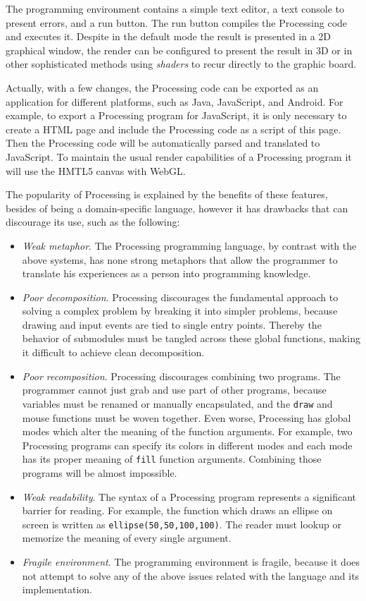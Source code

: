 The programming environment contains a simple text editor, a text console to present errors, and a run button. The run button compiles the Processing code and executes it. Despite in the default mode the result is presented in a 2D graphical window, the render can be configured to present the result in 3D or in other sophisticated methods using \textit{shaders} to recur directly to the graphic board.

Actually, with a few changes, the Processing code can be exported as an application for different platforms, such as Java, JavaScript, and Android. For example, to export a Processing program for JavaScript, it is only necessary to create a HTML page and include the Processing code as a script of this page. Then the Processing code will be automatically parsed and translated to JavaScript. To maintain the usual render capabilities of a Processing program it will use the HMTL5 canvas with WebGL.

The popularity of Processing is explained by the benefits of these features, besides of being a domain-specific language, however it has drawbacks that can discourage its use, such as the following:

\begin{itemize}
  \item \textit{Weak metaphor}. The Processing programming language, by contrast with the above systems, has none strong metaphors that allow the programmer to translate his experiences as a person into programming knowledge. 

  \item \textit{Poor decomposition}. Processing discourages the fundamental approach to solving a complex problem by breaking it into simpler problems, because drawing and input events are tied to single entry points. Thereby the behavior of submodules must be tangled across these global functions, making it difficult to achieve clean decomposition.

  \item \textit{Poor recomposition}. Processing discourages combining two programs. The programmer cannot just grab and use part of other programs, because variables must be renamed or manually encapsulated, and the \texttt{draw} and mouse functions must be woven together. Even worse, Processing has global modes which alter the meaning of the function arguments. For example, two Processing programs can specify its colors in different modes and each mode has its proper meaning of \texttt{fill} function arguments. Combining those programs will be almost impossible. 

  \item \textit{Weak readability}. The syntax of a Processing program represents a significant barrier for reading. For example, the function which draws an ellipse on screen is written as \texttt{ellipse(50,50,100,100)}. The reader must lookup or memorize the meaning of every single argument.

  \item \textit{Fragile environment}. The programming environment is fragile, because it does not attempt to solve any of the above issues related with the language and its implementation.
\end{itemize}

